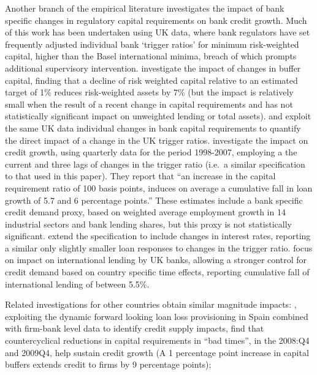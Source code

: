 \documentclass[
]{article}
\begin{document}
Another branch of the empirical literature investigates the impact of bank specific changes in regulatory capital requirements on bank credit growth. Much of this work has been undertaken using UK data, where bank regulators have set frequently adjusted individual bank `trigger ratios' for minimum risk-weighted capital, higher than the Basel international minima, breach of which prompts additional supervisory intervention. \citet{francis2012capital} investigate the impact of changes in buffer capital, finding that a decline of risk weighted capital relative to an estimated target of 1\% reduces risk-weighted assets by 7\% (but the impact is relatively small when the result of a recent change in capital requirements and has not statistically significant impact on unweighted lending or total assets). \citet{aiyar2014international} and \citet{aiyar2016does} exploit the same UK data individual changes in bank capital requirements to quantify the direct impact of a change in the UK trigger ratios. \citet{aiyar2014international} investigate the impact on credit growth, using quarterly data for the period 1998-2007, employing a the current and three lags of changes in the trigger ratio (i.e.~a similar specification to that used in this paper). They report that ``an increase in the capital requirement ratio of 100 basis points, induces on average a cumulative fall in loan growth of 5.7 and 6 percentage points.'' These estimates include a bank specific credit demand proxy, based on weighted average employment growth in 14 industrial sectors and bank lending shares, but this proxy is not statistically significant. \citet{aiyar2016does} extend the specification to include changes in interest rates, reporting a similar only slightly smaller loan responses to changes in the trigger ratio. \citet{aiyar2016does} focus on impact on international lending by UK banks, allowing a stronger control for credit demand based on country specific time effects, reporting cumulative fall of international lending of between 5.5\%.

Related investigations for other countries obtain similar magnitude impacts: \citet{jimenez2017macroprudential}, exploiting the dynamic forward looking loan loss provisioning in Spain combined with firm-bank level data to identify credit supply impacts, find that countercyclical reductions in capital requirements in ``bad times'', in the 2008:Q4 and 2009Q4, help sustain credit growth (A 1 percentage point increase in capital buffers extends credit to firms by 9 percentage points);
\end{document}
